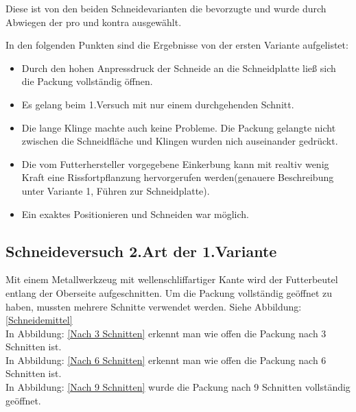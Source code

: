 Diese ist von den beiden Schneidevarianten die bevorzugte und wurde durch  Abwiegen der pro und kontra ausgewählt.

In den folgenden Punkten sind die Ergebnisse von der ersten Variante aufgelistet:

\begin{itemize}
\item Durch den hohen Anpressdruck der Schneide an die Schneidplatte ließ sich die Packung vollständig öffnen.
\item Es gelang beim 1.Versuch mit nur einem durchgehenden Schnitt.
\item Die lange Klinge machte auch keine Probleme. Die Packung gelangte nicht zwischen die Schneidfläche und Klingen wurden nich auseinander gedrückt.
\item Die vom Futterhersteller vorgegebene Einkerbung kann mit realtiv wenig Kraft eine Rissfortpflanzung hervorgerufen werden(genauere Beschreibung unter Variante 1, Führen zur Schneidplatte).
\item Ein exaktes Positionieren und Schneiden war möglich.
\end{itemize} 

\subsection{Schneideversuch 2.Art der 1.Variante}
\label{Schneideversuch_2}
Mit einem Metallwerkzeug mit wellenschliffartiger Kante wird der Futterbeutel entlang der Oberseite aufgeschnitten. Um die Packung vollständig geöffnet zu haben, mussten mehrere Schnitte verwendet werden. Siehe Abbildung: \ref{Schneidemittel}\\
In Abbildung: \ref{Nach 3 Schnitten} erkennt man wie offen die Packung nach 3 Schnitten ist.\\
In Abbildung: \ref{Nach 6 Schnitten} erkennt man wie offen die Packung nach 6 Schnitten ist.\\
In Abbildung: \ref{Nach 9 Schnitten} wurde die Packung nach 9 Schnitten vollständig geöffnet.

